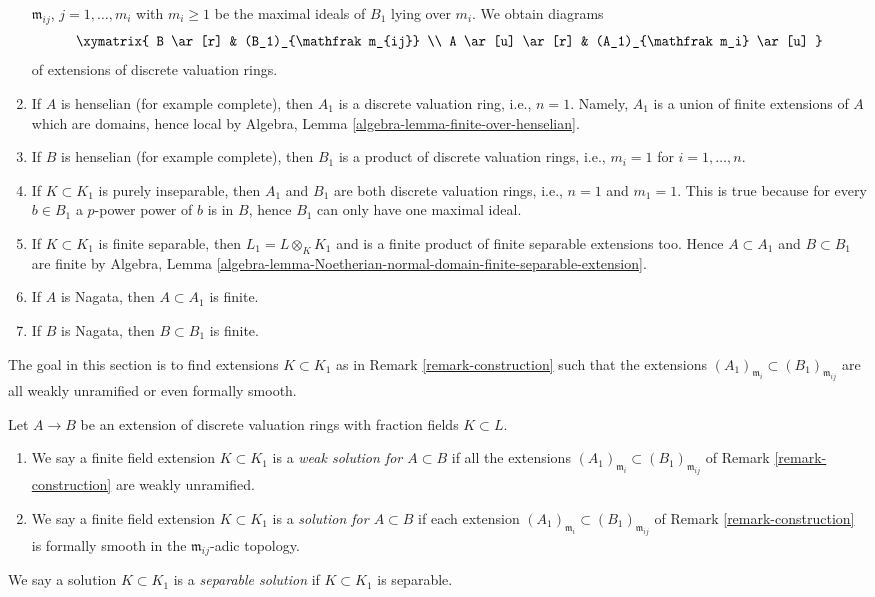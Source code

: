 \begin{remark}
\begin{enumerate}
$\mathfrak m_{ij}$, $j = 1, \ldots, m_i$ with $m_i \geq 1$
be the maximal ideals of $B_1$ lying over $m_i$. We obtain diagrams
$$
\xymatrix{
B \ar[r] & (B_1)_{\mathfrak m_{ij}} \\
A \ar[u] \ar[r] & (A_1)_{\mathfrak m_i} \ar[u]
}
$$
of extensions of discrete valuation rings.
\item If $A$ is henselian (for example complete), then $A_1$ is a
discrete valuation ring, i.e., $n = 1$.
Namely, $A_1$ is a union of finite extensions of $A$ which are domains,
hence local by Algebra, Lemma \ref{algebra-lemma-finite-over-henselian}.
\item If $B$ is henselian (for example complete), then $B_1$
is a product of discrete valuation rings, i.e., $m_i = 1$ for
$i = 1, \ldots, n$.
\item If $K \subset K_1$ is purely inseparable, then $A_1$ and $B_1$
are both discrete valuation rings, i.e., $n = 1$ and $m_1 = 1$.
This is true because for every $b \in B_1$ a $p$-power power of $b$
is in $B$, hence $B_1$ can only have one maximal ideal.
\item If $K \subset K_1$ is finite separable, then $L_1 = L \otimes_K K_1$
and is a finite product of finite separable extensions too. Hence
$A \subset A_1$ and $B \subset B_1$ are finite by
Algebra, Lemma
\ref{algebra-lemma-Noetherian-normal-domain-finite-separable-extension}.
\item If $A$ is Nagata, then $A \subset A_1$ is finite.
\item If $B$ is Nagata, then $B \subset B_1$ is finite.
\end{enumerate}
\end{remark}

\noindent
The goal in this section is to find extensions $K \subset K_1$ as in
Remark \ref{remark-construction} such that the extensions
$(A_1)_{\mathfrak m_i} \subset (B_1)_{\mathfrak m_{ij}}$ are
all weakly unramified or even formally smooth.

\begin{definition}
\label{definition-solution}
Let $A \to B$ be an extension of discrete valuation rings with fraction
fields $K \subset L$.
\begin{enumerate}
\item We say a finite field extension $K \subset K_1$ is a
{\it weak solution for $A \subset B$} if all the extensions
$(A_1)_{\mathfrak m_i} \subset (B_1)_{\mathfrak m_{ij}}$ of
Remark \ref{remark-construction} are weakly unramified.
\item We say a finite field extension $K \subset K_1$ is a
{\it solution for $A \subset B$} if each extension
$(A_1)_{\mathfrak m_i} \subset (B_1)_{\mathfrak m_{ij}}$ of
Remark \ref{remark-construction} is formally smooth in
the $\mathfrak m_{ij}$-adic topology.
\end{enumerate}
We say a solution $K \subset K_1$ is a {\it separable solution}
if $K \subset K_1$ is separable.
\end{definition}

